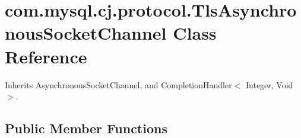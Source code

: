 \hypertarget{classcom_1_1mysql_1_1cj_1_1protocol_1_1_tls_asynchronous_socket_channel}{}\section{com.\+mysql.\+cj.\+protocol.\+Tls\+Asynchronous\+Socket\+Channel Class Reference}
\label{classcom_1_1mysql_1_1cj_1_1protocol_1_1_tls_asynchronous_socket_channel}


Inherits Asynchronous\+Socket\+Channel, and Completion\+Handler$<$ Integer, Void $>$.

\subsection*{Public Member Functions}
